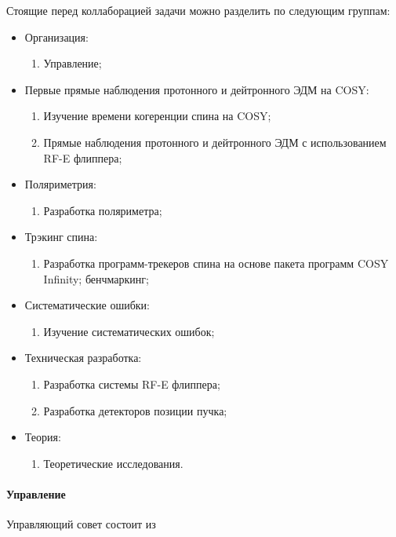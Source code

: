 \documentclass{extarticle}
\begin{document}
Стоящие перед коллаборацией задачи можно разделить по следующим группам:
\begin{itemize}
	\item Организация:
		\begin{enumerate}
			\item Управление;
		\end{enumerate}
	\item Первые прямые наблюдения протонного и дейтронного ЭДМ на COSY:
		\begin{enumerate}
			\item Изучение времени когеренции спина на COSY;
			\item Прямые наблюдения протонного и дейтронного ЭДМ с использованием RF-E флиппера;
		\end{enumerate}
	\item Поляриметрия:
		\begin{enumerate}
			\item Разработка поляриметра; 
		\end{enumerate}
	\item Трэкинг спина:
		\begin{enumerate}
			\item Разработка программ-трекеров спина на основе пакета программ COSY Infinity; бенчмаркинг;
		\end{enumerate}
	\item Систематические ошибки:
		\begin{enumerate}
			\item Изучение систематических ошибок;
		\end{enumerate}
	\item Техническая разработка:
		\begin{enumerate}
			\item Разработка системы RF-E флиппера;
			\item Разработка детекторов позиции пучка;
		\end{enumerate}
	\item Теория:
		\begin{enumerate}
			\item Теоретические исследования.
		\end{enumerate}
\end{itemize}

\paragraph{Управление}
Управляющий совет состоит из 
\end{document}

